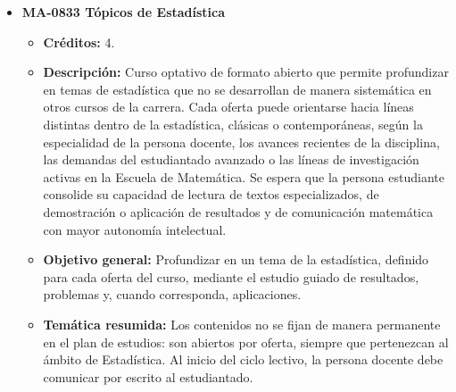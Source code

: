 \begin{itemize}[leftmargin=1.3em, itemsep=10pt, topsep=4pt, label={\color{Azul-UCR}$\blacksquare$}]
\item {\color{Azul-UCR}\textbf{MA-0833 Tópicos de Estadística}}\par\nopagebreak\smallskip
\begin{itemize}[leftmargin=1.1em, itemsep=3pt, topsep=2pt, parsep=2pt, label={\textendash}]
\item \textbf{Créditos:} 4.
\item \textbf{Descripción:} Curso optativo de formato abierto que permite profundizar en temas de estadística que no se desarrollan de manera sistemática en otros cursos de la carrera. Cada oferta puede orientarse hacia líneas distintas dentro de la estadística, clásicas o contemporáneas, según la especialidad de la persona docente, los avances recientes de la disciplina, las demandas del estudiantado avanzado o las líneas de investigación activas en la Escuela de Matemática. Se espera que la persona estudiante consolide su capacidad de lectura de textos especializados, de demostración o aplicación de resultados y de comunicación matemática con mayor autonomía intelectual.
\item \textbf{Objetivo general:} Profundizar en un tema de la estadística, definido para cada oferta del curso, mediante el estudio guiado de resultados, problemas y, cuando corresponda, aplicaciones.
\item \textbf{Temática resumida:} Los contenidos no se fijan de manera permanente en el plan de estudios: son abiertos por oferta, siempre que pertenezcan al ámbito de Estadística. Al inicio del ciclo lectivo, la persona docente debe comunicar por escrito al estudiantado.
\end{itemize}


\end{itemize}

